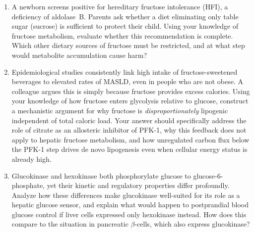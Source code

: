 \documentclass{tufte-handout}
\begin{document}
\begin{enumerate}

\item A newborn screens positive for hereditary fructose intolerance (HFI), a deficiency of aldolase~B.
  Parents ask whether a diet eliminating only table sugar (sucrose) is sufficient to protect their child.
  Using your knowledge of fructose metabolism, evaluate whether this recommendation is complete.
  Which other dietary sources of fructose must be restricted, and at what step would metabolite accumulation cause harm?

\item Epidemiological studies consistently link high intake of fructose-sweetened beverages to elevated rates of MASLD, even in people who are not obese.
  A colleague argues this is simply because fructose provides excess calories.
  Using your knowledge of how fructose enters glycolysis relative to glucose, construct a mechanistic argument for why fructose is \emph{disproportionately} lipogenic independent of total caloric load.
  Your answer should specifically address the role of citrate as an allosteric inhibitor of PFK-1, why this feedback does not apply to hepatic fructose metabolism, and how unregulated carbon flux below the PFK-1 step drives de novo lipogenesis even when cellular energy status is already high.

\item Glucokinase and hexokinase both phosphorylate glucose to glucose-6-phosphate, yet their kinetic and regulatory properties differ profoundly.
  Analyze how these differences make glucokinase well-suited for its role as a hepatic glucose sensor, and explain what would happen to postprandial blood glucose control if liver cells expressed only hexokinase instead.
  How does this compare to the situation in pancreatic $\beta$-cells, which also express glucokinase?

\end{enumerate}



\end{document}
